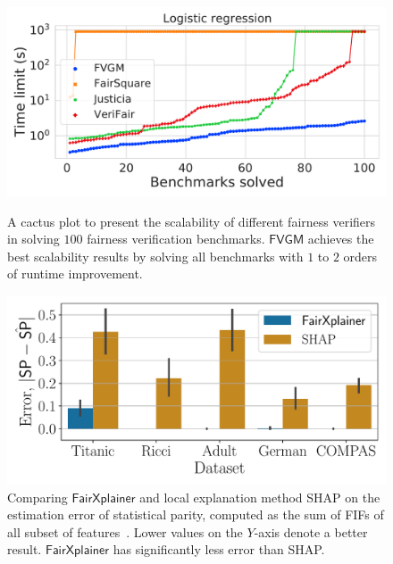 \documentclass{article}
\begin{document}
	
	
	\begin{figure}
		\begin{minipage}{0.47\textwidth}
			\centering\begin{center}		
			\includegraphics[scale=0.3]{figures/cactus_all_verifiers_LR_time_}
			\end{center}
			\caption{A cactus plot to present the scalability of different fairness verifiers in solving $ 100 $ fairness verification benchmarks. $ \mathsf{FVGM} $ achieves the best scalability results by solving all benchmarks with $ 1 $ to $ 2 $ orders of runtime improvement.} \label{fig:scalability_exp}
		\end{minipage}\hfill
		\begin{minipage}{0.48\textwidth}
			\centering
			\includegraphics[scale=0.4]{figures/sp_train_accuracy}
			\caption{Comparing $ \mathsf{FairXplainer} $ and local explanation method SHAP on the estimation error of statistical parity, computed as the sum of FIFs of all subset of features~\cite{ghosh2022how}. Lower values on the $ Y $-axis denote a better result. $ \mathsf{FairXplainer} $ has significantly less error than SHAP.}\label{fig:estimation_error}
		\end{minipage}
	\end{figure}
	
\end{document}
